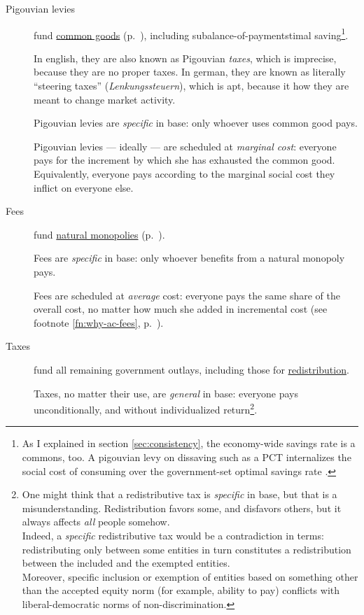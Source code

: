 \begin{description}
	\item[Pigouvian levies]  \label{sec:levies} fund \hyperref[sec:common-good]{common goods} (p.~\pageref{sec:common-good}), including subalance-of-paymentstimal saving\footnote{
		As I explained in section \ref{sec:consistency}, the economy-wide savings rate is a commons, too. A pigouvian levy on dissaving such as a \gls{PCT} internalizes the social cost of consuming over the government-set optimal savings rate \citep{Held2010a}.}. %

	In english, they are also known as Pigouvian \emph{taxes}, which is imprecise, because they are no proper taxes. In german, they are known as literally ``steering taxes'' (\emph{Lenkungssteuern}), which is apt, because it how they are meant to change market activity.

	Pigouvian levies are \emph{specific} in base: only whoever uses common good pays. 
	
	Pigouvian levies --- ideally --- are scheduled at \emph{marginal cost}: everyone pays for the increment by which she has exhausted the common good. Equivalently, everyone pays according to the marginal social cost they inflict on everyone else. 

	\item[Fees]  \label{sec:fees}
	fund \hyperref[sec:natural-monopoly]{natural monopolies} (p.~\pageref{sec:natural-monopoly}). 
	
	Fees are \emph{specific} in base: only whoever benefits from a natural monopoly pays. 
	
	Fees are scheduled at \emph{average} cost: everyone pays the same share of the overall cost, no matter how much she added in incremental cost (see footnote \ref{fn:why-ac-fees}, p.~\pageref{fn:why-ac-fees}). 

	\item[Taxes]  \label{sec:taxes} fund all remaining government outlays, including those for \hyperref[sec:redistributivepolicy]{redistribution}.
	
	Taxes, no matter their use, are \emph{general} in base: everyone pays unconditionally, and without individualized return\footnote{
		One might think that a redistributive tax is \emph{specific} in base, but that is a misunderstanding. Redistribution favors some, and disfavors others, but it always affects \emph{all} people somehow.\\
		Indeed, a \emph{specific} redistributive tax would be a contradiction in terms: redistributing only between some entities in turn constitutes a redistribution between the included and the exempted entities.\\ Moreover, specific inclusion or exemption of entities based on something other than the accepted equity norm (for example, ability to pay) conflicts with liberal-democratic norms of non-discrimination.}.
	 

\end{description}
